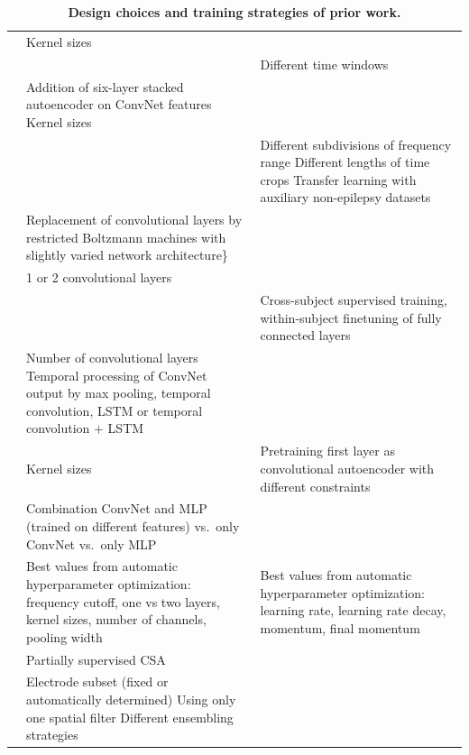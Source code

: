 \begin{table}[h!tb]
    \small
    \myfloatalign
    \begin{tabularx}{\textwidth}{p{}p{}p{}} \toprule
        \tableheadlinewithwidth{0.1\textwidth}{\large Study} & \tableheadlinewithwidth{0.4\textwidth}{\large Design choices}
        & \tableheadlinewithwidth{0.4\textwidth}{\large Training strategies} \\ 
        \midrule
    \cite{lawhern_eegnet:_2016} & Kernel sizes & \\
\cite{sun_remembered_2016} & & Different time windows \\
\cite{tabar_novel_2017} & Addition of six-layer stacked
autoencoder on ConvNet features Kernel sizes & \\
\cite{liang_predicting_2016} & & Different subdivisions of
frequency range Different lengths of time crops Transfer learning with
auxiliary non-epilepsy datasets \\
\cite{hajinoroozi_eeg-based_2016} & Replacement of
convolutional layers by restricted Boltzmann machines with slightly
varied network architecture\} & \\
\cite{antoniades_deep_2016} & 1 or 2 convolutional layers
& \\
\cite{page_wearable_2016} & & Cross-subject supervised
training, within-subject finetuning of fully connected layers \\
\cite{bashivan_learning_2016} & Number of convolutional
layers Temporal processing of ConvNet output by max pooling, temporal
convolution, LSTM or temporal convolution + LSTM & \\
\cite{stober_learning_2016} & Kernel sizes & Pretraining
first layer as convolutional autoencoder with different constraints \\
\cite{sakhavi_parallel_2015} & Combination ConvNet and MLP
(trained on different features) vs.~only ConvNet vs.~only MLP & \\
\cite{stober_using_2014} & Best values from automatic
hyperparameter optimization: frequency cutoff, one vs two layers, kernel
sizes, number of channels, pooling width & Best values from automatic
hyperparameter optimization: learning rate, learning rate decay,
momentum, final momentum \\
\cite{wang_deep_2013} & Partially supervised CSA & \\
\cite{cecotti_convolutional_2011} & Electrode subset (fixed
or automatically determined) Using only one spatial filter Different
ensembling strategies & \\
        \bottomrule
    \end{tabularx}
    \caption[Design choices and training strategies of prior work.]{\textbf{Design choices and training strategies of prior work.}}  \label{prior-work-design-choices-table}
\end{table}

